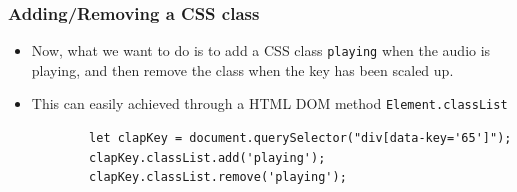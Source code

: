 \documentclass[handout,12pt]{beamer}
\begin{document}
\begin{frame}[fragile]
	\frametitle{Adding/Removing a CSS class}
	\begin{itemize}
		\item Now, what we want to do is to add a CSS class \texttt{playing} when the audio is playing, and then remove the class when the key has been scaled up.
		\item This can easily achieved through a HTML DOM method \texttt{Element.classList}\footnotemark
		\begin{verbatim}
		let clapKey = document.querySelector("div[data-key='65']");
		clapKey.classList.add('playing');
		clapKey.classList.remove('playing');
		\end{verbatim}
	\end{itemize}
	
\end{frame}
\end{document}
